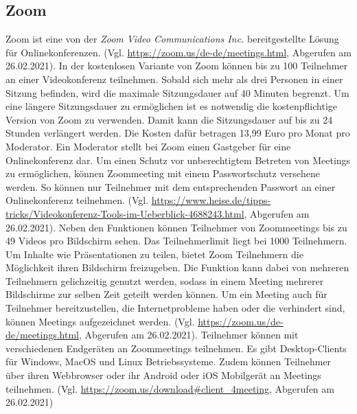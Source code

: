 \subsection{Zoom}
Zoom ist eine von der \textit{Zoom Video Communications Inc.} bereitgestellte Lösung für Onlinekonferenzen. (Vgl. \url{https://zoom.us/de-de/meetings.html}, Abgerufen am 26.02.2021).
In der kostenlosen Variante von Zoom können bis zu 100 Teilnehmer an einer Videokonferenz teilnehmen. Sobald sich mehr als drei Personen in einer Sitzung befinden, wird die maximale Sitzungsdauer auf 40 Minuten begrenzt. Um eine längere Sitzungsdauer zu ermöglichen ist es notwendig die kostenpflichtige Version von Zoom zu verwenden. Damit kann die Sitzungsdauer auf bis zu 24 Stunden verlängert werden. Die Kosten dafür betragen 13,99 Euro pro Monat pro Moderator. Ein Moderator stellt bei Zoom einen Gastgeber für eine Onlinekonferenz dar. Um einen Schutz vor unberechtigtem Betreten von Meetings zu ermöglichen, können Zoommeeting mit einem Passwortschutz versehene werden. So können nur Teilnehmer mit dem entsprechenden Passwort an einer Onlinekonferenz teilnehmen. (Vgl. \url{https://www.heise.de/tipps-tricks/Videokonferenz-Tools-im-Ueberblick-4688243.html}, Abgerufen am 26.02.2021).
Neben den Funktionen können Teilnehmer von Zoommeetings bis zu 49 Videos pro Bildschirm sehen. Das Teilnehmerlimit liegt bei 1000 Teilnehmern. Um Inhalte wie Präsentationen zu teilen, bietet Zoom Teilnehmern die Möglichkeit ihren Bildschirm freizugeben. Die Funktion kann dabei von mehreren Teilnehmern gelichzeitig genutzt werden, sodass in einem Meeting mehrerer Bildschirme zur selben Zeit geteilt werden können. Um ein Meeting auch für Teilnehmer bereitzustellen, die Internetprobleme haben oder die verhindert sind, können Meetings aufgezeichnet werden. (Vgl. \url{https://zoom.us/de-de/meetings.html}, Abgerufen am 26.02.2021).
Teilnehmer können mit verschiedenen Endgeräten an Zoommeetings teilnehmen. Es gibt Desktop-Clients für Windows, MacOS und Linux Betriebssysteme. Zudem können Teilnehmer über ihren Webbrowser oder ihr Android oder iOS Mobilgerät an Meetings teilnehmen. (Vgl. \url{https://zoom.us/download#client_4meeting}, Abgerufen am 26.02.2021)

